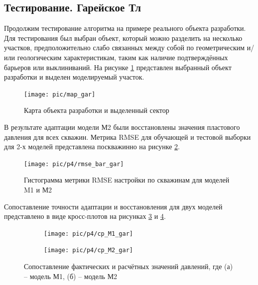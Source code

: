 \documentclass[14pt]{article}
\begin{document}
\subsection{Тестирование. Гарейское Тл}
Продолжим тестирование алгоритма на примере реального объекта разработки.
Для тестирования был выбран объект, который можно разделить на несколько участков, предположительно слабо связанных между собой по геометрическим и/или геологическим характеристикам, таким как наличие подтверждённых барьеров или выклиниваний.
На рисунке \ref{fig:mapgar} представлен выбранный объект разработки и выделен моделируемый участок.
\begin{figure}
	\centering
	\texttt{[image: pic/map\_gar]}
	\label{fig:mapgar}
	\caption{Карта объекта разработки и выделенный сектор}
\end{figure}

В результате адаптации модели М2 были восстановлены значения пластового давления для всех скважин. Метрика RMSE для обучающей и тестовой выборки для 2-х моделей представлена поскважинно на рисунке \ref{fig:bar_mape_gar_s1s2}.
\begin{figure}
	\centering
	\texttt{[image: pic/p4/rmse\_bar\_gar]}
	\caption{Гистограмма метрики RMSE настройки по скважинам для моделей M1 и М2}
	\label{fig:bar_mape_gar_s1s2}
\end{figure}
Сопоставление точности адаптации и восстановления для двух моделей представлено в виде кросс-плотов на рисунках \ref{fig:gar_s1_cp_m1} и \ref{fig:gar_s1_cp_m2}.

\begin{figure}[!htb]
	\begin{subfigure}[b]{0.45\linewidth}
		\texttt{[image: pic/p4/cp\_M1\_gar]}
		\caption{}
		\label{fig:gar_s1_cp_m1}
	\end{subfigure}
	\begin{subfigure}[b]{0.45\linewidth}
		\texttt{[image: pic/p4/cp\_M2\_gar]}
		\caption{}
		\label{fig:gar_s1_cp_m2}
	\end{subfigure}
	\label{fig:gar_s1_cp}
	\caption{Сопоставление фактических и расчётных значений давлений, где (а) -- модель М1, (б) -- модель М2}
\end{figure}
\end{document}
